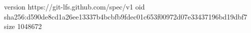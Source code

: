 version https://git-lfs.github.com/spec/v1
oid sha256:d590de8cd1a26ee13337b4bcbfb9fdec01c653f00972d07e33437196bd19dbf7
size 1048672
